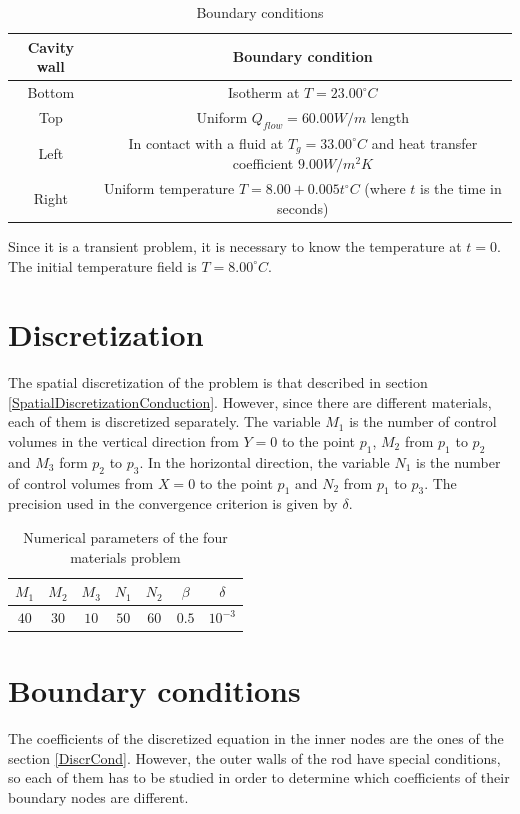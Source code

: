\begin{table}
	\centering
	\begin{tabular}{ |c|c|}
		\hline
		Cavity wall & Boundary condition \\ \hline
		Bottom & Isotherm at $T=23.00 ^{\circ}C$ \\ \hline
		Top & Uniform $Q_{flow}=60.00 W/m$ length \\ \hline
		Left & In contact with a fluid at $T_{g}=33.00 ^{\circ}C$ and heat transfer coefficient $9.00 W/m^{2}K$ \\ \hline
		Right & Uniform temperature $T=8.00+0.005t ^{\circ}C$ (where $t$ is the time in seconds) \\ \hline
	\end{tabular}
\caption{Boundary conditions}
\end{table}
Since it is a transient problem, it is necessary to know the temperature at $t=0$. The initial temperature field is $T=8.00 ^{\circ}C$.

\section{Discretization}
The spatial discretization of the problem is that described in section \ref{SpatialDiscretizationConduction}. However, since there are different materials, each of them is discretized separately. The variable $M_{1}$ is the number of control volumes in the vertical direction from $Y=0$ to the point $p_{1}$, $M_{2}$ from $p_{1}$ to $p_{2}$ and $M_{3}$ form $p_{2}$ to $p_{3}$. In the horizontal direction, the variable $N_{1}$ is the number of control volumes from $X=0$ to the point $p_{1}$ and $N_{2}$ from $p_{1}$ to $p_{3}$. The precision used in the convergence criterion is given by $\delta$.
\begin{table}[h]
	\centering
	\begin{tabular}{ |c|c|c|c|c|c|c| }
		\hline
		$M_{1}$ & $M_{2}$ & $M_{3}$ & $N_{1}$ & $N_{2}$ & $\beta$ & $\delta$ \\ \hline
		$40$ & $30$ & $10$ & $50$ & $60$ & $0.5$ & $10^{-3}$ \\ \hline
	\end{tabular}
	\caption{Numerical parameters of the four materials problem}
\end{table}

\section{Boundary conditions}
The coefficients of the discretized equation in the inner nodes are the ones of the section \ref{DiscrCond}. However, the outer walls of the rod have special conditions, so each of them has to be studied in order to determine which coefficients of their boundary nodes are different.

